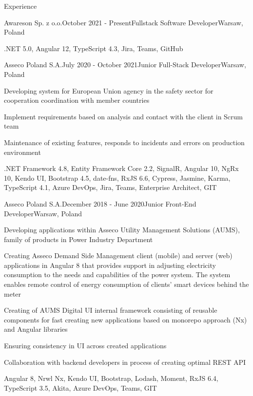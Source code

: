 \documentclass{resume} %
\begin{document}

\begin{rSection}{Experience}

\begin{rSubsection}{Awareson Sp. z o.o.}{October 2021 - Present}{Fullstack Software Developer}{Warsaw, Poland}
\item .NET 5.0, Angular 12, TypeScript 4.3, Jira, Teams, GitHub
\end{rSubsection}


\begin{rSubsection}{Asseco Poland S.A.}{July 2020 - October 2021}{Junior Full-Stack Developer}{Warsaw, Poland}
\item Developing system for European Union agency in the safety sector for cooperation coordination with member countries
\item Implement requirements based on analysis and contact with the client in Scrum team
\item Maintenance of existing features, responds to incidents and errors on production environment
\item .NET Framework 4.8, Entity Framework Core 2.2, SignalR, Angular 10, NgRx 10, Kendo UI, Bootstrap 4.5, date-fns, RxJS 6.6, Cypress, Jasmine, Karma, TypeScript 4.1, Azure DevOps, Jira, Teams, Enterprise Architect, GIT
\end{rSubsection}


\begin{rSubsection}{Asseco Poland S.A.}{December 2018 - June 2020}{Junior Front-End Developer}{Warsaw, Poland}
\item Developing applications within Asseco Utility Management Solutions (AUMS), family of products in Power Industry Department
\item Creating Asseco Demand Side Management client (mobile) and server (web) applications in Angular 8 that provides support in adjusting electricity consumption to the needs and capabilities of the power system. The system enables remote control of energy consumption of clients’ smart devices behind the meter
\item Creating of AUMS Digital UI internal framework consisting of reusable components for fast creating new applications based on monorepo approach (Nx) and Angular libraries
\item Ensuring consistency in UI across created applications
\item Collaboration with backend developers in process of creating optimal REST API
\item Angular 8, Nrwl Nx, Kendo UI, Bootstrap, Lodash, Moment, RxJS 6.4, TypeScript 3.5, Akita, Azure DevOps, Teams, GIT
\end{rSubsection}


\end{rSection}
\end{document}
